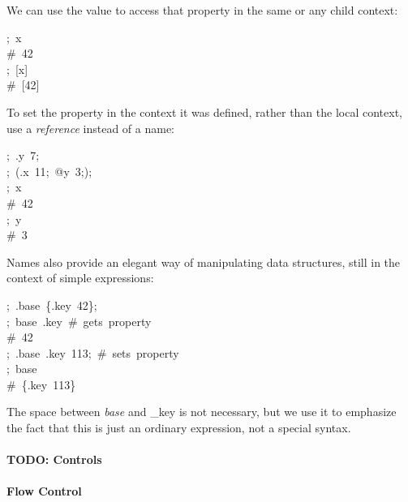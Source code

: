\documentclass[preprint]{{sigplanconf}}
\begin{document}
We can use the value  to access that property in the same or any child context:%
\begin{mdpre}%
\noindent;~x\\
{\#~42}\\
;~{}[x]\\
{\#~{}[42]}%
\end{mdpre}\noindent{}To set the property in the context it was defined, rather than the local context,
use a \emph{reference} instead of a name:
\begin{mdpre}%
\noindent;~.y~7;\\
;~(.x~{11};~{@y}~3;);\\
;~x\\
{\#~42}\\
;~y\\
{\#~3}%
\end{mdpre}\noindent{}Names also provide an elegant way of manipulating data structures, still
in the context of simple expressions:
\begin{mdpre}%
\noindent;~.base~\{.key~{42}\};\\
;~base~.key~{\#~gets~property}\\
{\#~42}\\
;~.base~.key~{113};~{\#~sets~property}\\
;~base\\
{\#~\{.key~113\}}%
\end{mdpre}\noindent{}The space between \emph{base} and \_key is not necessary, but we use it to
emphasize the fact that this is just an ordinary expression, not a
special syntax.

\paragraph{TODO: Controls}\label{sec-todo--controls}%

\paragraph{Flow Control}\label{sec-flow-control}%
\end{document}
